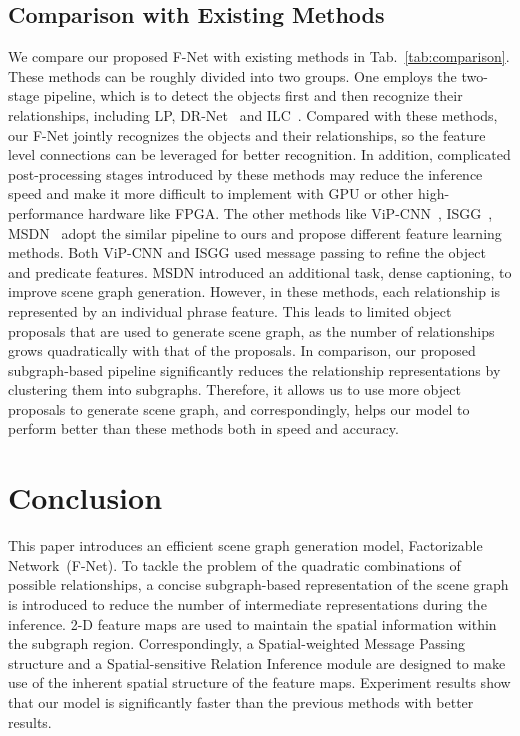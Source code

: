 \documentclass[runningheads]{llncs}
\begin{document}
\subsection{Comparison with Existing Methods}
We compare our proposed F-Net with existing methods in Tab.~\ref{tab:comparison}. These methods can be roughly divided into two groups. One employs the two-stage pipeline, which is to detect the objects first and then recognize their relationships, including LP\cite{visual_relationship}, DR-Net~\cite{dai2017detecting} and ILC~\cite{plummer2016phrase}. Compared with these methods, our F-Net jointly recognizes the objects and their relationships, so the feature level connections can be leveraged for better recognition. In addition, complicated post-processing stages introduced by these methods may reduce the inference speed and make it more difficult to implement with GPU or other high-performance hardware like FPGA. 
The other methods like ViP-CNN~\cite{li2017vip}, ISGG~\cite{xu2017scene}, MSDN~\cite{li2017scene} adopt the similar pipeline to ours and propose different feature learning methods. Both ViP-CNN and ISGG used message passing to refine the object and predicate features. MSDN introduced an additional task, dense captioning, to improve scene graph generation. However, in these methods, each relationship is represented by an individual phrase feature. This leads to limited object proposals that are used to generate scene graph, as the number of relationships grows quadratically with that of the proposals. In comparison, our proposed subgraph-based pipeline significantly reduces the relationship representations by clustering them into subgraphs. 
Therefore, it allows us to use more object proposals to generate scene graph, and correspondingly, helps our model to perform better than these methods both in speed and accuracy. 







\section{Conclusion}

This paper introduces an efficient scene graph generation model, Factorizable Network~(F-Net). To tackle the problem of the quadratic combinations of possible relationships, a concise subgraph-based representation of the scene graph is introduced to reduce the number of intermediate representations during the inference. 2-D feature maps are used to maintain the spatial information within the subgraph region. Correspondingly, a Spatial-weighted Message Passing structure and a Spatial-sensitive Relation Inference module are designed to make use of the inherent spatial structure of the feature maps. Experiment results show that our model is significantly faster than the previous methods with better results. 
\end{document}
